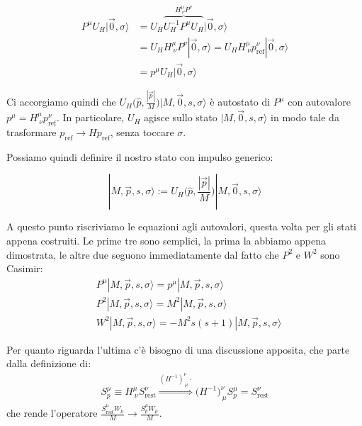 \documentclass[../main.tex]{subfiles}
\begin{document}
\begin{align*}
    P^\mu U_H|\Vec{0}, \sigma\rangle &= U_H \overbrace{U_H^{-1} P^\mu U_H}^{H^\mu_{~\nu}P^\nu} |\Vec{0}, \sigma\rangle \\
    & = U_H H^\mu_{~\nu}P^\nu |\Vec{0}, \sigma\rangle = U_H H^\mu_{~\nu} p^\nu_\text{ref} |\Vec{0}, \sigma\rangle \\
    & = p^\mu U_H |\Vec{0}, \sigma\rangle
\end{align*}

Ci accorgiamo quindi che \(U_H\big(\hat{p}, \frac{|\Vec{p}|}{M}\big)|M, \Vec{0}, s, \sigma\rangle\) è autostato di $P^\mu$ con autovalore $p^\mu = H^\mu_{~\nu} p^\nu_\text{ref}$. In particolare, $U_H$ agisce sullo stato $|M, \Vec{0}, s, \sigma\rangle$ in modo tale da trasformare \(p_\text{ref} \rightarrow Hp_\text{ref}\), senza toccare $\sigma$.

Possiamo quindi definire il nostro stato con impulso generico:

\begin{equation}
    \boxed{|M, \Vec{p}, s, \sigma\rangle := U_H\bigg(\hat{p}, \frac{|\Vec{p}|}{M}\bigg)|M, \Vec{0}, s, \sigma\rangle}
    \label{eq:generic_momentum_state}
\end{equation}

A questo punto riscriviamo le equazioni agli autovalori, questa volta per gli stati appena costruiti. Le prime tre sono semplici, la prima la abbiamo appena dimostrata, le altre due seguono immediatamente dal fatto che \(P^2\) e \(W^2\) sono Casimir:
\[
\begin{aligned}
    &P^\mu|M, \Vec{p}, s, \sigma\rangle = p^\mu|M, \Vec{p}, s, \sigma\rangle\\
    &P^2|M, \Vec{p}, s, \sigma\rangle = M^2|M, \Vec{p}, s, \sigma\rangle\\
    &W^2|M, \Vec{p}, s, \sigma\rangle = -M^2 s(s+1)|M, \Vec{p}, s, \sigma\rangle
\end{aligned}
\]

Per quanto riguarda l'ultima c'è bisogno di una discussione apposita, che parte dalla definizione di: 
\[
\begin{aligned}
    S^\mu_p \equiv H^\mu_{~\nu}S^\nu_\text{rest} \overset{(H^{-1})^\nu_{~\mu}\cdot}{\Longrightarrow} \big(H^{-1}\big)^\nu_{~\mu} S^\mu_p = S^\nu_\text{rest}
\end{aligned}
\]
che rende l'operatore \(\frac{S^\mu_\text{rest}W_\mu}{M} \rightarrow \frac{S^\mu_pW_\mu}{M}\).
\end{document}
